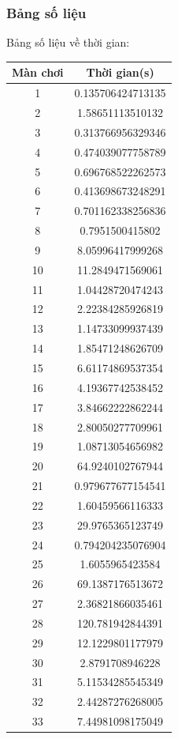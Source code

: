 \documentclass[a4paper, 11pt]{article}
\begin{document}
\subsubsection{Bảng số liệu}
Bảng số liệu về thời gian:
\begin{center}
	\begin{tabular}{|c|c|}
		\hline
		Màn chơi & Thời gian(s)      \\ \hline
		1        & 0.135706424713135 \\ \hline
		2        & 1.58651113510132  \\ \hline
		3        & 0.313766956329346 \\ \hline
		4        & 0.474039077758789 \\ \hline
		5        & 0.696768522262573 \\ \hline
		6        & 0.413698673248291 \\ \hline
		7        & 0.701162338256836 \\ \hline
		8        & 0.7951500415802   \\ \hline
		9        & 8.05996417999268  \\ \hline
		10       & 11.2849471569061  \\ \hline
		11       & 1.04428720474243  \\ \hline
		12       & 2.22384285926819  \\ \hline
		13       & 1.14733099937439  \\ \hline
		14       & 1.85471248626709  \\ \hline
		15       & 6.61174869537354  \\ \hline
		16       & 4.19367742538452  \\ \hline
		17       & 3.84662222862244  \\ \hline
		18       & 2.80050277709961  \\ \hline
		19       & 1.08713054656982  \\ \hline
		20       & 64.9240102767944  \\ \hline
		21       & 0.979677677154541 \\ \hline
		22       & 1.60459566116333  \\ \hline
		23       & 29.9765365123749  \\ \hline
		24       & 0.794204235076904 \\ \hline
		25       & 1.6055965423584   \\ \hline
		26       & 69.1387176513672  \\ \hline
		27       & 2.36821866035461  \\ \hline
		28       & 120.781942844391  \\ \hline
		29       & 12.1229801177979  \\ \hline
		30       & 2.8791708946228   \\ \hline
		31       & 5.11534285545349  \\ \hline
		32       & 2.44287276268005  \\ \hline
		33       & 7.44981098175049  \\ \hline
	\end{tabular}
\end{center}
\end{document}
